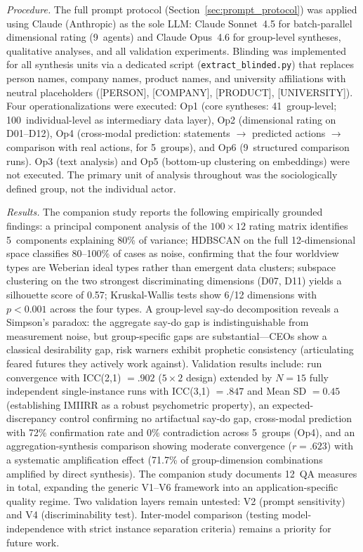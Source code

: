 \documentclass[11pt,a4paper]{article}
\theoremstyle{definition}
\theoremstyle{plain}
\theoremstyle{remark}
\begin{document}
\emph{Procedure.} The full prompt protocol (Section~\ref{sec:prompt_protocol}) was applied using Claude (Anthropic) as the sole LLM: Claude Sonnet~4.5 for batch-parallel dimensional rating (9~agents) and Claude Opus~4.6 for group-level syntheses, qualitative analyses, and all validation experiments. Blinding was implemented for all synthesis units via a dedicated script (\texttt{extract\_blinded.py}) that replaces person names, company names, product names, and university affiliations with neutral placeholders ([PERSON], [COMPANY], [PRODUCT], [UNIVERSITY]). Four operationalizations were executed: Op1 (core syntheses: 41~group-level; 100~individual-level as intermediary data layer), Op2 (dimensional rating on D01--D12), Op4 (cross-modal prediction: statements $\to$ predicted actions $\to$ comparison with real actions, for 5~groups), and Op6 (9~structured comparison runs). Op3 (text analysis) and Op5 (bottom-up clustering on embeddings) were not executed. The primary unit of analysis throughout was the sociologically defined group, not the individual actor.

\emph{Results.} The companion study \citep{Geiger2026b} reports the following empirically grounded findings: a principal component analysis of the $100 \times 12$ rating matrix identifies 5~components explaining 80\% of variance; HDBSCAN on the full 12-dimensional space classifies 80--100\% of cases as noise, confirming that the four worldview types are Weberian ideal types rather than emergent data clusters; subspace clustering on the two strongest discriminating dimensions (D07, D11) yields a silhouette score of 0.57; Kruskal-Wallis tests show 6/12 dimensions with $p < 0.001$ across the four types. A group-level say-do decomposition reveals a Simpson's paradox: the aggregate say-do gap is indistinguishable from measurement noise, but group-specific gaps are substantial---CEOs show a classical desirability gap, risk warners exhibit prophetic consistency (articulating feared futures they actively work against). Validation results include: run convergence with ICC(2,1) $= .902$ ($5 \times 2$ design) extended by $N = 15$ fully independent single-instance runs with ICC(3,1) $= .847$ and Mean SD $= 0.45$ (establishing IMIIRR as a robust psychometric property), an expected-discrepancy control confirming no artifactual say-do gap, cross-modal prediction with 72\% confirmation rate and 0\% contradiction across 5~groups (Op4), and an aggregation-synthesis comparison showing moderate convergence ($r = .623$) with a systematic amplification effect (71.7\% of group-dimension combinations amplified by direct synthesis). The companion study documents 12~QA measures in total, expanding the generic V1--V6 framework into an application-specific quality regime. Two validation layers remain untested: V2 (prompt sensitivity) and V4 (discriminability test). Inter-model comparison (testing model-independence with strict instance separation criteria) remains a priority for future work.
\end{document}
